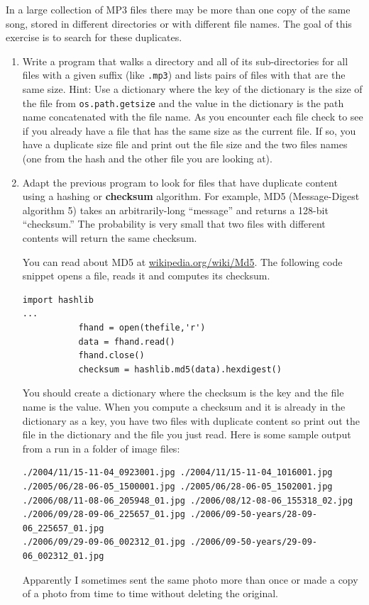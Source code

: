 \documentclass[10pt]{book}
\begin{document}
\begin{ex}
\label{checksum}


In a large collection of MP3 files there may be more than one
copy of the same song, stored in different directories or with
different file names.  The goal of this exercise is to search for
these duplicates.

\begin{enumerate}

\item Write a program that walks a directory and all of its
sub-directories for all files with a given suffix (like {\tt .mp3})
and lists pairs of files with that are the same size.
Hint: Use a dictionary where the key of the dictionary is the size
of the file from {\tt  os.path.getsize} and the value in the 
dictionary is the path name concatenated with the file name.  
As you encounter each file check to see if you already have a
file that has the same size as the current file.  
If so, you have a duplicate
size file and print out the file size and the two files names 
(one from the hash and the other file you are looking at).


\item Adapt the previous program to look for files that 
have duplicate content using a hashing or {\bf checksum}
algorithm.  For example,
MD5 (Message-Digest algorithm 5) takes an arbitrarily-long
``message'' and returns a 128-bit ``checksum.''  The probability
is very small that two files with different contents will
return the same checksum.

You can read about MD5 at \url{wikipedia.org/wiki/Md5}.  The 
following code snippet opens a file, reads it and computes
its checksum.

\beforeverb
\begin{verbatim}
import hashlib 
...
           fhand = open(thefile,'r')
           data = fhand.read()
           fhand.close()
           checksum = hashlib.md5(data).hexdigest()
\end{verbatim}
\afterverb
%
You should create a dictionary where the checksum is the key 
and the file name is the value.   When you compute a checksum
and it is already in the dictionary as a key, you have two files with 
duplicate content so print out the file in the dictionary
and the file you just read.  Here is some sample output
from a run in a folder of image files:
\beforeverb
\begin{verbatim}
./2004/11/15-11-04_0923001.jpg ./2004/11/15-11-04_1016001.jpg
./2005/06/28-06-05_1500001.jpg ./2005/06/28-06-05_1502001.jpg
./2006/08/11-08-06_205948_01.jpg ./2006/08/12-08-06_155318_02.jpg
./2006/09/28-09-06_225657_01.jpg ./2006/09-50-years/28-09-06_225657_01.jpg
./2006/09/29-09-06_002312_01.jpg ./2006/09-50-years/29-09-06_002312_01.jpg
\end{verbatim}
\afterverb
%
Apparently I sometimes sent the same photo more than once 
or made a copy of a photo from time to time without deleting
the original.


\end{enumerate}
\end{ex}
\end{document}
